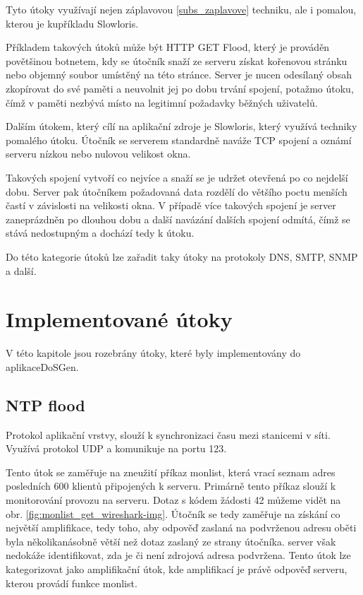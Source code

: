Tyto útoky využívají nejen záplavovou \ref{subs_zaplavove} techniku, ale i pomalou, kterou je
kupříkladu Slowloris.
 
Příkladem takových útoků může být HTTP GET Flood, který je prováděn povětšinou botnetem, kdy
se útočník snaží ze serveru získat kořenovou stránku nebo objemný soubor umístěný na této
stránce. Server je nucen odesílaný obsah zkopírovat do své paměti a neuvolnit jej po dobu
trvání spojení, potažmo útoku, čímž v paměti nezbývá místo na legitimní požadavky běžných
uživatelů.

Dalším útokem, který cílí na aplikační zdroje je Slowloris, který využívá techniky pomalého
útoku. Útočník se serverem standardně naváže TCP spojení a oznámí serveru nízkou nebo nulovou
velikost okna.

Takových spojení vytvoří co nejvíce a snaží se je udržet otevřená po co nejdelší dobu.
Server pak útočníkem požadovaná data rozdělí do většího poctu menších častí v závislosti na
velikosti okna. V případě více takových spojení je server zaneprázdněn po dlouhou dobu a
další navázání dalších spojení odmítá, čímž se stává nedostupným a dochází tedy k 
útoku.

Do této kategorie útoků lze zařadit taky útoky na protokoly DNS, SMTP, SNMP a další.

\section{Implementované útoky}
V této kapitole jsou rozebrány útoky, které byly implementovány do aplikace\newline DoSGen.

\subsection{NTP flood}
Protokol aplikační vrstvy,  slouží k synchronizaci času mezi stanicemi v síti.
Využívá protokol UDP a komunikuje na portu 123.

Tento útok se zaměřuje na zneužití příkaz monlist, která vrací seznam  adres
posledních 600 klientů připojených k  serveru. Primárně tento příkaz slouží k
monitorování provozu na serveru. Dotaz s kódem žádosti 42   můžeme vidět
na obr.  \ref{fig:monlist_get_wireshark-img}. Útočník se tedy zaměřuje na získání co
největší amplifikace, tedy toho, aby odpověď zaslaná na podvrženou  adresu oběti
byla několikanásobně větší než dotaz zaslaný ze strany útočníka.  server však
nedokáže identifikovat, zda je či není zdrojová adresa podvržena.
Tento útok lze kategorizovat jako amplifikační útok, kde amplifikací je právě odpověď
 serveru, kterou provádí funkce monlist.


